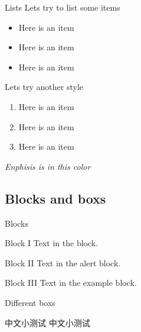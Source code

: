 \documentclass{libs/SUSTech_format}
\newcommand{\fonta}{\CJKfamily{font01}}
\begin{document}
\begin{frame}{Lists}
    Lets try to list some items
    \begin{itemize}
        \item Here is an item
        \item Here is an item
        \item Here is an item
    \end{itemize}

    \vspace{0.4cm} %
    
    Lets try another style
    \begin{enumerate}
        \item Here is an item
        \item Here is an item
        \item Here is an item
    \end{enumerate}

    \vspace{0.2cm}

     \emph{Enphisis is in this color}
\end{frame}

\subsection{Blocks and boxs}
\begin{frame}{Blocks}
    \begin{block}{Block I}
        Text in the block.
    \end{block}

    \begin{alertblock}{Block II}
        Text in the alert block.
    \end{alertblock}

    \begin{exampleblock}{Block III}
        Text in the example block.
    \end{exampleblock}   
\end{frame}



\begin{frame}{Different boxs}
    
    中文小测试
    {\fonta 中文小测试}

    \pause


    \pause

\end{frame}
\end{document}

